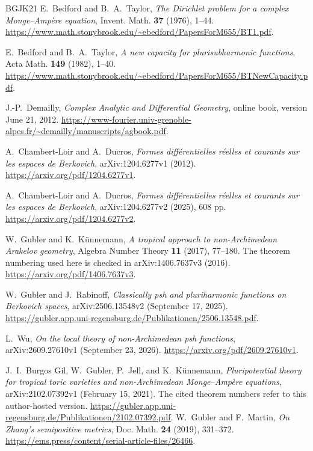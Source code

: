 \documentclass[11pt,a4paper]{article}
\numberwithin{equation}{section}
\theoremstyle{definition}
\theoremstyle{remark}
\begin{document}
\begin{thebibliography}{BGJK21}
E.~Bedford and B.~A.~Taylor,
\emph{The Dirichlet problem for a complex Monge--Amp\`ere equation},
Invent. Math. \textbf{37} (1976), 1--44.
\url{https://www.math.stonybrook.edu/~ebedford/PapersForM655/BT1.pdf}.

E.~Bedford and B.~A.~Taylor,
\emph{A new capacity for plurisubharmonic functions},
Acta Math. \textbf{149} (1982), 1--40.
\url{https://www.math.stonybrook.edu/~ebedford/PapersForM655/BTNewCapacity.pdf}.

J.-P.~Demailly,
\emph{Complex Analytic and Differential Geometry},
online book, version June 21, 2012.
\url{https://www-fourier.univ-grenoble-alpes.fr/~demailly/manuscripts/agbook.pdf}.

A.~Chambert-Loir and A.~Ducros,
\emph{Formes diff\'erentielles r\'eelles et courants sur les espaces de Berkovich},
arXiv:1204.6277v1 (2012).
\url{https://arxiv.org/pdf/1204.6277v1}.

A.~Chambert-Loir and A.~Ducros,
\emph{Formes diff\'erentielles r\'eelles et courants sur les espaces de Berkovich},
arXiv:1204.6277v2 (2025), 608 pp.
\url{https://arxiv.org/pdf/1204.6277v2}.

W.~Gubler and K.~K\"unnemann,
\emph{A tropical approach to non-Archimedean Arakelov geometry},
Algebra Number Theory \textbf{11} (2017), 77--180.
The theorem numbering used here is checked in arXiv:1406.7637v3 (2016).
\url{https://arxiv.org/pdf/1406.7637v3}.

W.~Gubler and J.~Rabinoff,
\emph{Classically psh and pluriharmonic functions on Berkovich spaces},
arXiv:2506.13548v2 (September 17, 2025).
\url{https://gubler.app.uni-regensburg.de/Publikationen/2506.13548.pdf}.

L.~Wu,
\emph{On the local theory of non-Archimedean psh functions},
arXiv:2609.27610v1 (September 23, 2026).
\url{https://arxiv.org/pdf/2609.27610v1}.

J.~I.~Burgos Gil, W.~Gubler, P.~Jell, and K.~K\"unnemann,
\emph{Pluripotential theory for tropical toric varieties and non-Archimedean
Monge--Amp\`ere equations}, arXiv:2102.07392v1 (February 15, 2021).
The cited theorem numbers refer to this author-hosted version.
\url{https://gubler.app.uni-regensburg.de/Publikationen/2102.07392.pdf}.
W.~Gubler and F.~Martin,
\emph{On Zhang's semipositive metrics},
Doc. Math. \textbf{24} (2019), 331--372.
\url{https://ems.press/content/serial-article-files/26466}.



\end{thebibliography}
\end{document}
